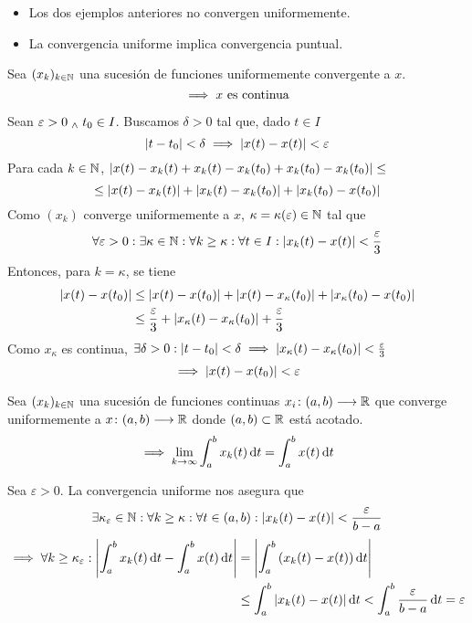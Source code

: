 \begin{obs}\begin{itemize}
		\item Los dos ejemplos anteriores no convergen uniformemente.
		\item La convergencia uniforme implica convergencia puntual.
	\end{itemize}\end{obs}
\begin{prop}
	Sea $(x_k)_{k\in\mathbb{N}}$ una sucesión de funciones uniformemente convergente a $x$.
	\[\implies x \text{ es continua}\]
	\begin{dem}
		Sean $\varepsilon > 0 \; _{\wedge} \; t_0 \in I$. Buscamos $\delta > 0$ tal que, dado $t\in I$
		\[\left|t-t_0\right| < \delta \implies \left|x(t)-x(t)\right|< \varepsilon\]
		Para cada $k\in\mathbb{N}$, $\left|x(t)-x_k(t)+x_k(t)-x_k(t_0)+x_k(t_0)-x_k(t_0)\right| \leq$
		\[\leq \left|x(t)-x_k(t)\right| + \left|x_k(t)-x_k(t_0)\right|  + \left|x_k(t_0)-x(t_0)\right|\]
		Como $(x_k)$ converge uniformemente a $x$, $\kappa = \kappa(\varepsilon) \in \mathbb{N}$ tal que
		\[\forall \varepsilon > 0 : \exists \kappa \in \mathbb{N} : \forall k\geq \kappa : \forall t\in I : \left|x_k(t) - x(t)\right| < \frac{\varepsilon}{3}\]
		Entonces, para $k=\kappa$, se tiene
		\[\begin{aligned}
				\left|x(t)-x(t_0)\right| & \leq \left|x(t)-x(t_0)\right|+\left|x(t)-x_\kappa(t_0)\right| + \left|x_\kappa(t_0)-x(t_0)\right|         \\
				                  & \leq \frac{\varepsilon}{3} + \left|x_\kappa(t)-x_\kappa(t_0)\right| + \frac{\varepsilon}{3}
			\end{aligned}\]
		Como $x_\kappa$ es continua, $\exists \delta > 0 : \left|t-t_0\right| < \delta \implies \left|x_\kappa(t)-x_\kappa(t_0)\right| < \frac{\varepsilon}{3}$
		\[\implies\left|x(t)-x(t_0)\right| < \varepsilon\]
	\end{dem}
\end{prop}
\begin{prop}
	Sea $(x_k)_{k\in\mathbb{N}}$ una sucesión de funciones continuas $x_i \colon (a,b) \longrightarrow \mathbb{R}$ que converge uniformemente a $x \colon (a,b) \longrightarrow \mathbb{R}$ donde $(a,b) \subset \mathbb{R}$ está acotado.
	\[\implies \lim_{k\to\infty} \int_{a}^{b} x_k(t) \odif{t} = \int_{a}^{b} x(t) \odif{t}\]
	\begin{dem}
		Sea $\varepsilon > 0$. La convergencia uniforme nos asegura que
		\[\exists \kappa_\varepsilon \in \mathbb{N} : \forall k \geq \kappa : \forall t \in (a, b) : \left|x_k(t) - x(t)\right| < \frac{\varepsilon}{b-a}\]
		\[\begin{aligned}
				\implies\forall k\geq \kappa_\varepsilon : \abs{\int_{a}^{b} x_k(t) \odif{t} - \int_{a}^{b} x(t) \odif{t}} & = \abs{\int_{a}^{b} \left(x_k(t) - x(t)\right) \odif{t}}                                                     \\
				                                                                                                           & \leq \int_{a}^{b} \abs{x_k(t) - x(t)} \odif{t} < \int_{a}^{b} \frac{\varepsilon}{b-a} \odif{t} = \varepsilon
			\end{aligned}\]
	\end{dem}
\end{prop}

